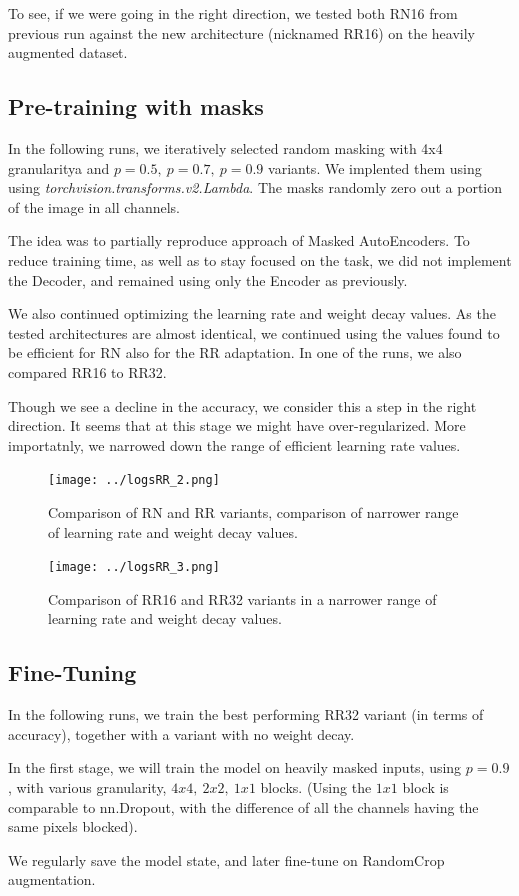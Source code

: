 \documentclass[12pt,a4paper]{article}
\begin{document}
To see, if we were going in the right direction, we tested both RN16 from
previous run against the new architecture (nicknamed RR16) on the
heavily augmented dataset.

\subsection{Pre-training with masks}

In the following runs, we iteratively selected random masking
with 4x4 granularitya and $p=0.5, \ p=0.7, \ p=0.9$ variants.
We implented them using using 
\emph{torchvision.transforms.v2.Lambda}. The masks randomly
zero out a portion of the image in all channels.

The idea was to partially reproduce approach of Masked AutoEncoders.
To reduce training time, as well as to stay focused on the
task, we did not implement the Decoder, and remained using
only the Encoder as previously.

We also continued optimizing the learning rate and weight decay
values. As the tested architectures are almost identical, we
continued using the values found to be efficient for RN also
for the RR adaptation. In one of the runs, we also compared
RR16 to RR32.

Though we see a decline in the accuracy, we consider this
a step in the right direction. It seems that at this stage
we might have over-regularized. More importatnly, we narrowed
down the range of efficient learning rate values.

\begin{figure}[H]
  \texttt{[image: ../logsRR\_2.png]}
  \caption{Comparison of RN and RR variants, comparison of narrower
  range of learning rate and weight decay values.}
\end{figure}

\begin{figure}[H]
  \texttt{[image: ../logsRR\_3.png]}
  \caption{Comparison of RR16 and RR32 variants in a narrower range
  of learning rate and weight decay values.}
\end{figure}

\subsection{Fine-Tuning}

In the following runs, we train the best performing RR32
variant (in terms of accuracy), together with a variant
with no weight decay.

In the first stage, we will train the model on heavily masked
inputs, using $p=0.9$, with various granularity, 
$4x4, \ 2x2, \ 1x1$ blocks. (Using the $1x1$ block is
comparable to nn.Dropout, with the difference of all the
channels having the same pixels blocked).

We regularly save the model state, and later fine-tune on
RandomCrop augmentation.
\end{document}
